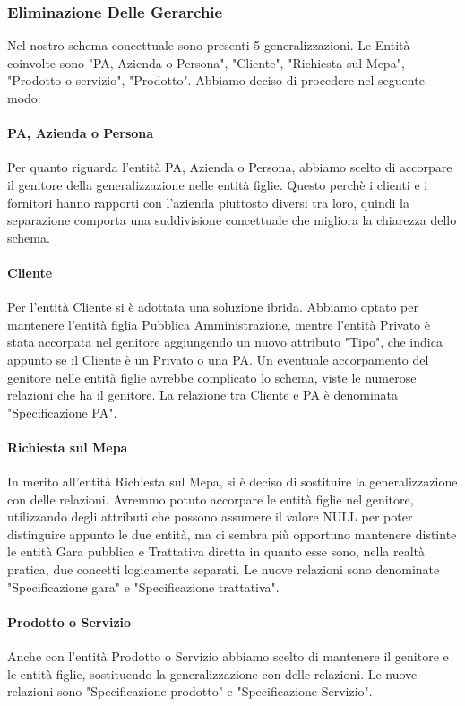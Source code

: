 \newpage
\subsubsection{Eliminazione Delle Gerarchie}

Nel nostro schema concettuale sono presenti 5 generalizzazioni. Le Entità coinvolte sono "PA, Azienda o Persona", "Cliente", "Richiesta sul Mepa", "Prodotto o servizio", "Prodotto".
\newline
Abbiamo deciso di procedere nel seguente modo:

\paragraph{PA, Azienda o Persona}
Per quanto riguarda l'entità PA, Azienda o Persona, abbiamo scelto di accorpare il genitore della generalizzazione nelle entità figlie. Questo perchè i clienti e i fornitori hanno rapporti con l'azienda piuttosto diversi tra loro, quindi la separazione comporta una suddivisione concettuale che migliora la chiarezza dello schema.
\paragraph{Cliente}
Per l'entità Cliente si è adottata una soluzione ibrida. Abbiamo optato per mantenere l'entità figlia Pubblica Amministrazione, mentre l'entità Privato è stata accorpata nel genitore aggiungendo un nuovo attributo "Tipo", che indica appunto se il Cliente è un Privato o una PA. Un eventuale accorpamento del genitore nelle entità figlie avrebbe complicato lo schema, viste le numerose relazioni che ha il genitore.
\newline
La relazione tra Cliente e PA è denominata "Specificazione PA".
\paragraph{Richiesta sul Mepa}
In merito all'entità Richiesta sul Mepa, si è deciso di sostituire la generalizzazione con delle relazioni. Avremmo potuto accorpare le entità figlie nel genitore, utilizzando degli attributi che possono assumere il valore NULL per poter distinguire appunto le due entità, ma ci sembra più opportuno mantenere distinte le entità Gara pubblica e Trattativa diretta in quanto esse sono, nella realtà pratica, due concetti logicamente separati.
Le nuove relazioni sono denominate "Specificazione gara" e "Specificazione trattativa".
\paragraph{Prodotto o Servizio}
Anche con l'entità Prodotto o Servizio abbiamo scelto di mantenere il genitore e le entità figlie, sostituendo la generalizzazione con delle relazioni. Le nuove relazioni sono "Specificazione prodotto" e "Specificazione Servizio".
